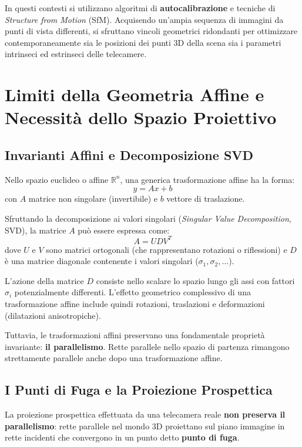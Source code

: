 In questi contesti si utilizzano algoritmi di \textbf{autocalibrazione} e tecniche di \textit{Structure from Motion} (SfM). Acquisendo un'ampia sequenza di immagini da punti di vista differenti, si sfruttano vincoli geometrici ridondanti per ottimizzare contemporaneamente sia le posizioni dei punti 3D della scena sia i parametri intrinseci ed estrinseci delle telecamere.

\section{Limiti della Geometria Affine e Necessità dello Spazio Proiettivo}

\subsection{Invarianti Affini e Decomposizione SVD}
Nello spazio euclideo o affine $\mathbb{R}^n$, una generica trasformazione affine ha la forma:
\begin{equation}
    y = A x + b
\end{equation}
con $A$ matrice non singolare (invertibile) e $b$ vettore di traslazione.

Sfruttando la decomposizione ai valori singolari (\textit{Singular Value Decomposition}, SVD), la matrice $A$ può essere espressa come:
\begin{equation}
    A = U D V^T
\end{equation}
dove $U$ e $V$ sono matrici ortogonali (che rappresentano rotazioni o riflessioni) e $D$ è una matrice diagonale contenente i valori singolari ($\sigma_1, \sigma_2, \dots$). 

L'azione della matrice $D$ consiste nello scalare lo spazio lungo gli assi con fattori $\sigma_i$ potenzialmente differenti. L'effetto geometrico complessivo di una trasformazione affine include quindi rotazioni, traslazioni e deformazioni (dilatazioni anisotropiche).

Tuttavia, le trasformazioni affini preservano una fondamentale proprietà invariante: \textbf{il parallelismo}. Rette parallele nello spazio di partenza rimangono strettamente parallele anche dopo una trasformazione affine.

\subsection{I Punti di Fuga e la Proiezione Prospettica}
La proiezione prospettica effettuata da una telecamera reale \textbf{non preserva il parallelismo}: rette parallele nel mondo 3D proiettano sul piano immagine in rette incidenti che convergono in un punto detto \textbf{punto di fuga}.


